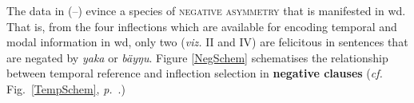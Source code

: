 %	
%	

The data in (--) evince a species of \textsc{negative asymmetry} that is manifested in \gls{wd}. That is, from the four inflections which are available for encoding temporal and modal information in \gls{wd}, only two (\textit{viz.} \gls{II} and \gls{IV}) are felicitous in sentences that are negated by \textit{yaka} or \textit{bäyŋu}. Figure \ref{NegSchem} schematises the relationship between temporal reference and inflection selection in \textbf{negative clauses} (\textit{cf.} Fig.~\ref{TempSchem}, \textit{p.}~\pageref{TempSchem}.)


